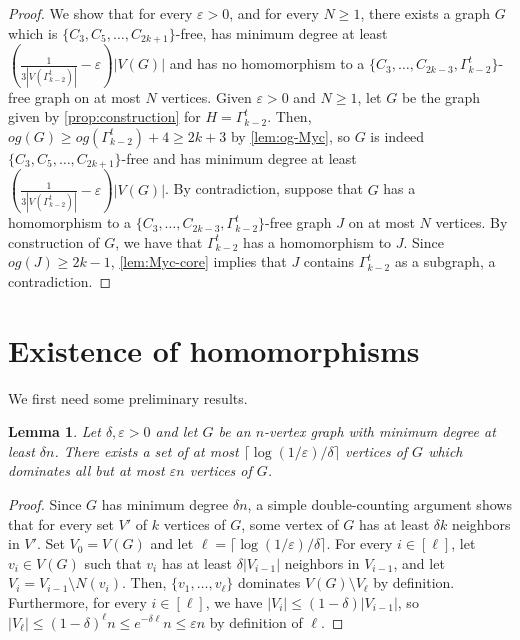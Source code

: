 \documentclass{article}
\newtheorem{lemma}[theorem]{Lemma}
\begin{document}
\begin{proof}
    We show that for every $\varepsilon > 0$, and for every $N \geq 1$, there exists a graph $G$ which is $\{C_3, C_5, \ldots, C_{2k+1}\}$-free, has minimum degree at least $\left(\frac{1}{3|V(\Gamma_{k-2}^t)|} - \varepsilon\right)|V(G)|$ and has no homomorphism to a $\{C_3, \ldots,\allowbreak C_{2k-3},\allowbreak \Gamma_{k-2}^t\}$-free graph on at most $N$ vertices.
    Given $\varepsilon > 0$ and $N \geq 1$, let $G$ be the graph given by \cref{prop:construction} for $H = \Gamma_{k-2}^t$.
    Then, $og(G) \geq og(\Gamma_{k-2}^t) + 4 \geq 2k+3$ by \cref{lem:og-Myc}, so $G$ is indeed $\{C_3, C_5, \ldots, C_{2k+1}\}$-free and has minimum degree at least $\left(\frac{1}{3|V(\Gamma_{k-2}^t)|} - \varepsilon\right)|V(G)|$.
    By contradiction, suppose that $G$ has a homomorphism to a $\{C_3, \ldots, C_{2k-3}, \Gamma_{k-2}^t\}$-free graph $J$ on at most $N$ vertices.
    By construction of $G$, we have that $\Gamma_{k-2}^t$ has a homomorphism to $J$. Since $og(J) \geq 2k-1$, \cref{lem:Myc-core} implies that $J$ contains $\Gamma_{k-2}^t$ as a subgraph, a contradiction.
\end{proof}

\section{Existence of homomorphisms}

We first need some preliminary results.

\begin{lemma}\label{lem:almost-dom}
    Let $\delta, \varepsilon > 0$ and let $G$ be an $n$-vertex graph with minimum degree at least $\delta n$.
    There exists a set of at most $\lceil\log(1/\varepsilon)/\delta\rceil$ vertices of $G$ which dominates all but at most $\varepsilon n$ vertices of $G$.
\end{lemma}

\begin{proof}
    Since $G$ has minimum degree $\delta n$, a simple double-counting argument shows that for every set $V'$ of $k$ vertices of $G$, some vertex of $G$ has at least $\delta k$ neighbors in $V'$.
    Set $V_0 = V(G)$ and let $\ell = \lceil\log(1/\varepsilon)/\delta\rceil$.
    For every $i \in [\ell]$, let $v_i \in V(G)$ such that $v_i$ has at least $\delta |V_{i-1}|$ neighbors in $V_{i-1}$, and let $V_i = V_{i-1} \setminus N(v_i)$.
    Then, $\{v_1, \ldots, v_{\ell}\}$ dominates $V(G) \setminus V_{\ell}$ by definition.
    Furthermore, for every $i \in [\ell]$, we have $|V_i| \leq (1-\delta)|V_{i-1}|$, so $|V_{\ell}| \leq (1-\delta)^{\ell}n \leq e^{-\delta{\ell}}n \leq \varepsilon n$ by definition of $\ell$.
\end{proof}
\end{document}
